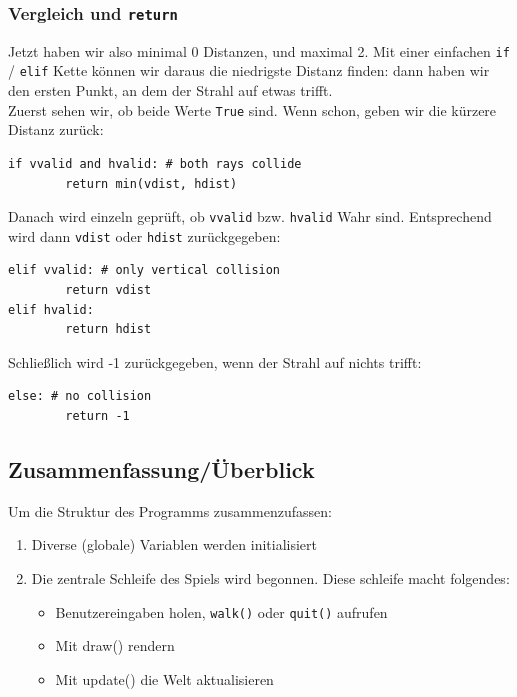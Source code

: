 \documentclass[a4paper,12pt]{report}
\begin{document}
\subsubsection{Vergleich und \texttt{return}}
Jetzt haben wir also minimal 0 Distanzen, und maximal 2. Mit einer einfachen \texttt{if} / \texttt{elif} Kette können wir daraus die niedrigste Distanz finden: dann haben wir den ersten Punkt, an dem der Strahl auf etwas trifft. \\
Zuerst sehen wir, ob beide Werte \texttt{True} sind. Wenn schon, geben wir die kürzere Distanz zurück:
\begin{Verbatim}[baselinestretch=1.0, xleftmargin=1cm]
if vvalid and hvalid: # both rays collide
        return min(vdist, hdist)
\end{Verbatim}
Danach wird einzeln geprüft, ob \texttt{vvalid} bzw. \texttt{hvalid} Wahr sind. Entsprechend wird dann \texttt{vdist} oder \texttt{hdist} zurückgegeben:
\begin{Verbatim}[baselinestretch=1.0, xleftmargin=1cm]
elif vvalid: # only vertical collision
        return vdist
elif hvalid:
        return hdist
\end{Verbatim}
Schließlich wird -1 zurückgegeben, wenn der Strahl auf nichts trifft:
\begin{Verbatim}[baselinestretch=1.0, xleftmargin=1cm]
else: # no collision
        return -1
\end{Verbatim}

\subsection{Zusammenfassung/Überblick}

Um die Struktur des Programms zusammenzufassen:
\begin{spacing}{1.0}
\begin{framed}
\begin{enumerate}
	\item Diverse (globale) Variablen werden initialisiert
	\item Die zentrale Schleife des Spiels wird begonnen. Diese schleife macht folgendes:
	\begin{itemize}
		\item Benutzereingaben holen, \texttt{walk()} oder \texttt{quit()} aufrufen
		\item Mit draw() rendern
		\item Mit update() die Welt aktualisieren
	\end{itemize}
\end{enumerate}
\end{framed}
\end{spacing}
\end{document}
